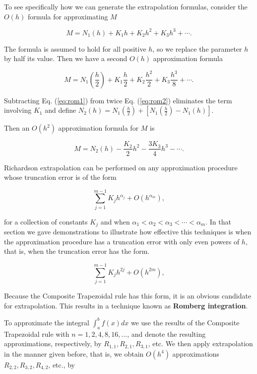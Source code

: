 \documentclass[preprint,12pt]{elsarticle}
\begin{document}
To see specifically how we can generate the extrapolation formulas, consider the $O(h)$ formula for approximating $M$

\begin{equation}
\label{eq:rom1}
    M=N_{1}(h)+K_{1}h+K_{2}h^{2}+K_{3}h^{3}+\cdots.
\end{equation}

The formula is assumed to hold for all positive $h$, so we replace the parameter $h$ by half its value. Then we have a second $O(h)$ approximation formula

\begin{equation}
\label{eq:rom2}
    M=N_{1}(\frac{h}{2})+K_{1}\frac{h}{2}+K_{2}\frac{h^2}{2}+K_{3}\frac{h^3}{8}+\cdots.
\end{equation}

Subtracting Eq. (\ref{eq:rom1}) from twice Eq. (\ref{eq:rom2}) eliminates the term involving $K_1$ and define $N_{2}(h)=N_{1}(\frac{h}{2})+\left[N_{1}(\frac{h}{2})-N_{1}(h)\right]$.

Then an $O(h^2)$ approximation formula for $M$ is 

\begin{equation}
    M=N_{2}(h)-\frac{K_2}{2}h^{2}-\frac{3K_3}{4}h^{3}-\cdots.
\end{equation}

Richardson extrapolation can be performed on any approximation procedure whose truncation error is of the form

\begin{equation}
    \sum_{j=1}^{m-1}K_{j}h^{\alpha_j} + O(h^{\alpha_m}),
\end{equation}

for a collection of constants $K_j$ and when $\alpha_1 < \alpha_2 < \alpha_3 < \cdots < \alpha_m$. In that section we gave demonstrations to illustrate how effective this techniques is when the approximation procedure has a truncation error with only even powers of $h$, that is, when the truncation error has the form.

\begin{equation}
    \sum_{j=1}^{m-1}K_{j}h^{2j} + O(h^{2m}),
\end{equation}

Because the Composite Trapezoidal rule has this form, it is an obvious candidate for extrapolation. This results in a technique known as \textbf{Romberg integration}.

To approximate the integral $\int_{a}^{b} f(x)dx$ we use the results of the Composite Trapezoidal rule with $n=1,2,4,8,16,\dots$, and denote the resulting approximations, respectively, by $R_{1,1},R_{2,1},R_{3,1}$, etc. We then apply extrapolation in the manner given before, that is, we obtain $O(h^4)$ approximations $R_{2,2},R_{3,2},R_{4,2}$, etc., by
\end{document}
